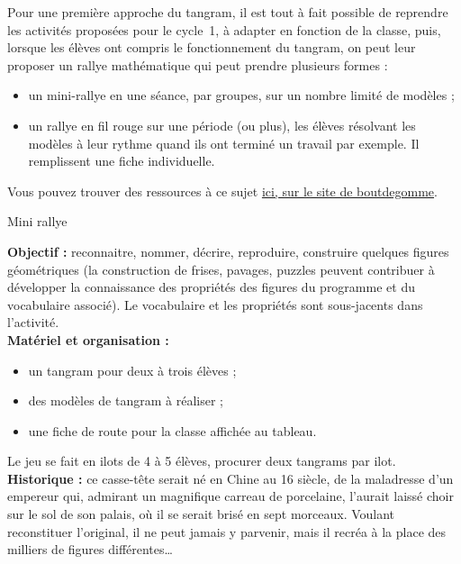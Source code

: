 \begin{exercice*}

Pour une première approche du tangram, il est tout à fait possible de reprendre les activités proposées pour le cycle~1, à adapter en fonction de la classe, puis, lorsque les élèves ont compris le fonctionnement du tangram, on peut leur proposer un rallye mathématique qui peut prendre plusieurs formes :
\begin{itemize}
   \item un mini-rallye en une séance, par groupes, sur un nombre limité de modèles ;
   \item un rallye en fil rouge sur une période (ou plus), les élèves résolvant les modèles à leur rythme quand ils ont terminé un travail par exemple. Il remplissent une fiche individuelle.
\end{itemize}

Vous pouvez trouver des ressources à ce sujet \href{http://boutdegomme.fr/rallye-tangram-a78475195}{ici, sur le site de boutdegomme}. \\

\begin{center}
   {\textcolor{B1}{{\Large Mini rallye}}}
\end{center}

{\bf Objectif :} reconnaitre, nommer, décrire, reproduire, construire quelques figures géométriques (la construction de frises, pavages, puzzles peuvent contribuer à développer la connaissance des propriétés des figures du programme et du vocabulaire associé). Le vocabulaire et les propriétés sont sous-jacents dans l'activité. \\

{\bf Matériel et organisation :}
\begin{itemize}
   \item un tangram pour deux à trois élèves ;
   \item des modèles de tangram à réaliser ;
   \item une fiche de route pour la classe affichée au tableau.
\end{itemize}
Le jeu se fait en ilots de 4 à 5 élèves, procurer deux tangrams par ilot. \\

{\bf Historique :} ce casse-tête serait né en Chine au 16 siècle, de la maladresse d’un empereur qui, admirant un magnifique carreau de porcelaine, l’aurait laissé choir sur le sol de son palais, où il se serait brisé en sept morceaux. Voulant reconstituer l’original, il ne peut jamais y parvenir, mais il recréa à la place des milliers de figures différentes\dots \\


\end{exercice*}
